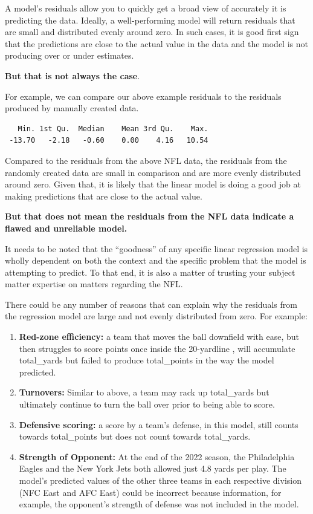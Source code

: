 \documentclass[
  letterpaper,
]{krantz}
\begin{document}
\begin{tcolorbox}
A model's residuals allow you to quickly get a broad view of accurately
it is predicting the data. Ideally, a well-performing model will return
residuals that are small and distributed evenly around zero. In such
cases, it is good first sign that the predictions are close to the
actual value in the data and the model is not producing over or under
estimates.

\textbf{But that is not always the case}.

For example, we can compare our above example residuals to the residuals
produced by manually created data.

\begin{verbatim}
   Min. 1st Qu.  Median    Mean 3rd Qu.    Max. 
 -13.70   -2.18   -0.60    0.00    4.16   10.54 
\end{verbatim}

Compared to the residuals from the above NFL data, the residuals from
the randomly created data are small in comparison and are more evenly
distributed around zero. Given that, it is likely that the linear model
is doing a good job at making predictions that are close to the actual
value.

\textbf{But that does not mean the residuals from the NFL data indicate
a flawed and unreliable model.}

It needs to be noted that the ``goodness'' of any specific linear
regression model is wholly dependent on both the context and the
specific problem that the model is attempting to predict. To that end,
it is also a matter of trusting your subject matter expertise on matters
regarding the NFL.

There could be any number of reasons that can explain why the residuals
from the regression model are large and not evenly distributed from
zero. For example:

\begin{enumerate}
\def\labelenumi{\arabic{enumi}.}
\item
  \textbf{Red-zone efficiency:} a team that moves the ball downfield
  with ease, but then struggles to score points once inside the
  20-yardline , will accumulate total\_yards but failed to produce
  total\_points in the way the model predicted.
\item
  \textbf{Turnovers:} Similar to above, a team may rack up total\_yards
  but ultimately continue to turn the ball over prior to being able to
  score.
\item
  \textbf{Defensive scoring:} a score by a team's defense, in this
  model, still counts towards total\_points but does not count towards
  total\_yards.
\item
  \textbf{Strength of Opponent:} At the end of the 2022 season, the
  Philadelphia Eagles and the New York Jets both allowed just 4.8 yards
  per play. The model's predicted values of the other three teams in
  each respective division (NFC East and AFC East) could be incorrect
  because information, for example, the opponent's strength of defense
  was not included in the model.
\end{enumerate}


\end{tcolorbox}
\end{document}
